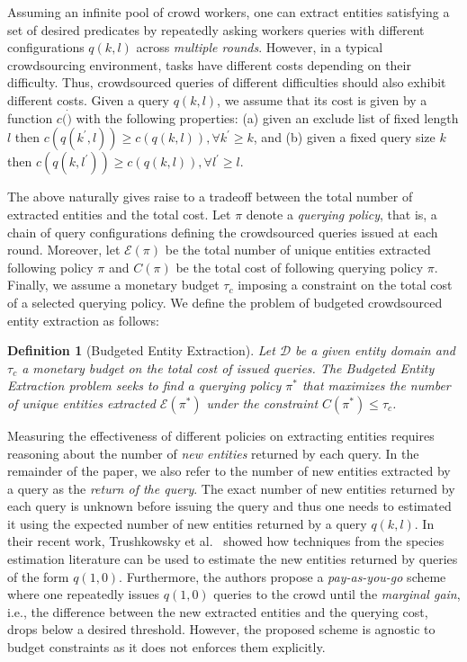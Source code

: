 \documentclass{vldb}
\newtheorem{definition}{Definition}
\newcommand{\domain}{\mathcal{D}}
\newcommand{\uentities}{\mathcal{E}}
\begin{document}
Assuming an infinite pool of crowd workers,  one can extract entities satisfying a set of desired predicates by repeatedly asking workers queries with different configurations $q(k,l)$ across {\em multiple rounds}. However, in a typical crowdsourcing environment, tasks have different costs depending on their difficulty. Thus, crowdsourced queries of different difficulties should also exhibit different costs. Given a query $q(k,l)$, we assume that its cost is given by a function $c(\dot)$ with the following properties: (a) given an exclude list of fixed length $l$ then $c(q(k^{\prime},l)) \geq c(q(k,l)),  \forall k^{\prime} \geq k$, and (b) given a fixed query size $k$ then $c(q(k,l^{\prime})) \geq c(q(k,l)), \forall l^{\prime} \geq l$. 

The above naturally gives raise to a tradeoff between the total number of extracted entities and the total cost. Let $\pi$ denote a {\em querying policy}, that is, a chain of query configurations defining the crowdsourced queries issued at each round. Moreover, let $\uentities(\pi)$ be the total number of unique entities extracted following policy $\pi$ and $C(\pi)$ be the total cost of following querying policy $\pi$. Finally, we assume a monetary budget $\tau_c$ imposing a constraint on the total cost of a selected querying policy. We define the problem of budgeted crowdsourced entity extraction as follows:

\begin{definition}[Budgeted Entity Extraction]
Let $\domain$ be a given entity domain and $\tau_c$ a monetary budget on the total cost of issued queries. The Budgeted Entity Extraction problem seeks to find 
a querying policy $\pi^*$ that maximizes the number of unique entities extracted $\uentities(\pi^*)$ under the constraint $C(\pi^*) \leq \tau_c$.
\end{definition}

Measuring the effectiveness of different policies on extracting entities requires reasoning about the number of {\em new entities} returned by each query. In the remainder of the paper, we also refer to the number of new entities extracted by a query as the {\em return of the query}. The exact number of new entities returned by each query is unknown before issuing the query and thus one needs to estimated it using the expected number of new entities returned by a query $q(k,l)$. In their recent work, Trushkowsky et al.~\cite{trushkowsky:2013} showed how techniques from the species estimation literature can be used to estimate the new entities returned by queries of the form $q(1,0)$. Furthermore, the authors propose a {\em pay-as-you-go} scheme where one repeatedly issues $q(1,0)$ queries to the crowd until the {\em marginal gain}, i.e., the difference between the new extracted entities and the querying cost, drops below a desired threshold. However, the proposed scheme is agnostic to budget constraints as it does not enforces them explicitly. 
\end{document}
